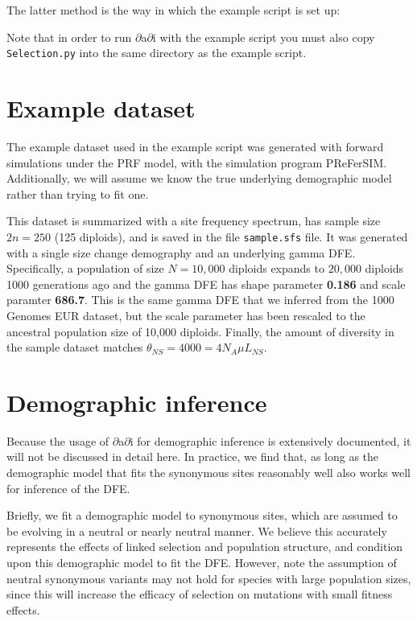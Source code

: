 \documentclass[11pt]{article}
\begin{document}
The latter method is the way in which the example script is set up:



Note that in order to run $\partial$a$\partial$i with the example script you must also copy \texttt{Selection.py} into the same directory as the example script.

\section{Example dataset}
The example dataset used in the example script was generated with forward simulations under the PRF model, with the simulation program PReFerSIM. Additionally, we will assume we know the true underlying demographic model rather than trying to fit one.

This dataset is summarized with a site frequency spectrum, has sample size $2n=250$ (125 diploids), and is saved in the file \texttt{sample.sfs} file. It was generated with a single size change demography and an underlying gamma DFE. Specifically, a population of size $N=10,000$ diploids expands to $20,000$ diploids 1000 generations ago and the gamma DFE has shape parameter \textbf{0.186} and scale paramter \textbf{686.7}. This is the same gamma DFE that we inferred from the 1000 Genomes EUR dataset, but the scale parameter has been rescaled to the ancestral population size of 10,000 diploids. Finally, the amount of diversity in the sample dataset matches $\theta_{NS}=4000=4N_A \mu L_{NS}$.

\section{Demographic inference}

Because the usage of $\partial$a$\partial$i for demographic inference is extensively documented, it will not be discussed in detail here. In practice, we find that, as long as the demographic model that fits the synonymous sites reasonably well also works well for inference of the DFE.  

Briefly, we fit a demographic model to synonymous sites, which are assumed to be evolving in a neutral or nearly neutral manner. We believe this accurately represents the effects of linked selection and population structure, and condition upon this demographic model to fit the DFE. However, note the assumption of neutral synonymous variants may not hold for species with large population sizes, since this will increase the efficacy of selection on mutations with small fitness effects.
\end{document}
